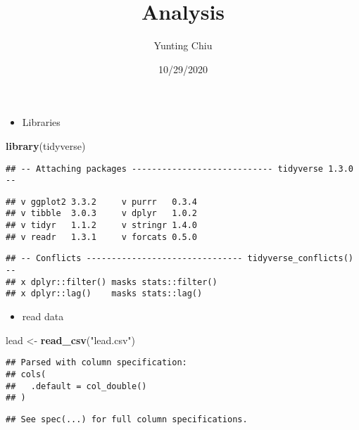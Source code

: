 \documentclass[
]{article}
\title{Analysis}
\author{Yunting Chiu}
\date{10/29/2020}
\newenvironment{Shaded}{\begin{snugshade}}{\end{snugshade}}
\newcommand{\KeywordTok}[1]{\textcolor[rgb]{0.13,0.29,0.53}{\textbf{#1}}}
\newcommand{\NormalTok}[1]{#1}
\newcommand{\StringTok}[1]{\textcolor[rgb]{0.31,0.60,0.02}{#1}}
\providecommand{\tightlist}{%
  \setlength{\itemsep}{0pt}\setlength{\parskip}{0pt}}
\begin{document}
\maketitle

\begin{itemize}
\tightlist
\item
  Libraries
\end{itemize}

\begin{Shaded}
\begin{Highlighting}[]
\KeywordTok{library}\NormalTok{(tidyverse)}
\end{Highlighting}
\end{Shaded}

\begin{verbatim}
## -- Attaching packages ---------------------------- tidyverse 1.3.0 --
\end{verbatim}

\begin{verbatim}
## v ggplot2 3.3.2     v purrr   0.3.4
## v tibble  3.0.3     v dplyr   1.0.2
## v tidyr   1.1.2     v stringr 1.4.0
## v readr   1.3.1     v forcats 0.5.0
\end{verbatim}

\begin{verbatim}
## -- Conflicts ------------------------------- tidyverse_conflicts() --
## x dplyr::filter() masks stats::filter()
## x dplyr::lag()    masks stats::lag()
\end{verbatim}

\begin{itemize}
\tightlist
\item
  read data
\end{itemize}

\begin{Shaded}
\begin{Highlighting}[]
\NormalTok{lead <-}\StringTok{ }\KeywordTok{read_csv}\NormalTok{(}\StringTok{"lead.csv"}\NormalTok{)}
\end{Highlighting}
\end{Shaded}

\begin{verbatim}
## Parsed with column specification:
## cols(
##   .default = col_double()
## )
\end{verbatim}

\begin{verbatim}
## See spec(...) for full column specifications.
\end{verbatim}
\end{document}
